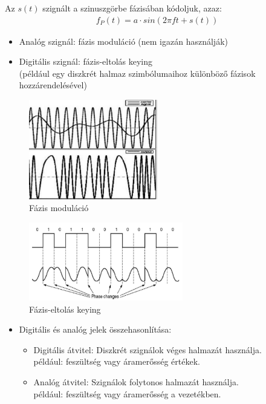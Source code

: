 \documentclass[12pt]{article}
\begin{document}
        Az $s(t)$ szignált a szinuszgörbe fázisában kódoljuk, azaz:
        \begin{align*}
            f_P(t) = a \cdot sin(2\pi f t + s(t))
        \end{align*}
        \begin{itemize}[leftmargin=7.5mm]
            \renewcommand{\labelitemi}{$\vcenter{\hbox{\tiny$\bullet$}}$}
            \item Analóg szignál: fázis moduláció (nem igazán használják)
            \item Digitális szignál: fázis-eltolás keying\\
            (például egy diszkrét halmaz szimbólumaihoz különböző fázisok hozzárendelésével)
        \end{itemize}
        \begin{figure}[H]
        	\centering
        	\includegraphics[width=0.5\textwidth]{img/fazis_mod.png}
        	\caption{Fázis moduláció}
        \end{figure}
        \begin{figure}[H]
        	\centering
        	\includegraphics[width=0.6\textwidth]{img/fazis_key.png}
        	\caption{Fázis-eltolás keying}	
        \end{figure}
        \begin{itemize}[leftmargin=7.5mm]
            \renewcommand{\labelitemi}{$\vcenter{\hbox{\tiny$\bullet$}}$}
			\item Digitális és analóg jelek összehasonlítása: \\
            \begin{itemize}[leftmargin=7.5mm]
                \renewcommand{\labelitemii}{$\vcenter{\hbox{\tiny$\circ$}}$}
			    \item Digitális átvitel: Diszkrét szignálok véges halmazát használja.\\
                például: feszültség vagy áramerősség értékek.\\
			    \item Analóg átvitel: Szignálok folytonos halmazát használja.\\
                például: feszültség vagy áramerősség a vezetékben.\\
        \end{itemize}
    \end{itemize}
\end{document}
